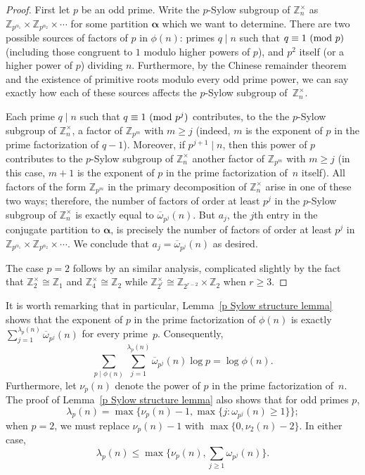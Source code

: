 \documentclass[12pt,reqno]{amsart}
\theoremstyle{definition}
\renewcommand{\mod}[1]{{\ifmmode\text{\rm\ (mod~$#1$)}\else\discretionary{}{}{\hbox{ }}\rm(mod~$#1$)\fi}}
\newcommand{\ovomega}{{\overline\omega}}
\newcommand{\Z}{{\mathbb Z}}
\newcommand{\Znt}{{\Z_n^\times}}
\newcommand{\balpha}{{\bm\alpha}}
\begin{document}
\begin{proof}
First let $p$ be an odd prime. Write the $p$-Sylow subgroup of $\Znt$ as $\Z_{p^{\alpha_1}} \times \Z_{p^{\alpha_2}} \times \cdots$ for some partition $\balpha$ which we want to determine. There are two possible sources of factors of $p$ in $\phi(n)$: primes $q\mid n$ such that $q \equiv 1 \mod p$ (including those congruent to $1$ modulo higher powers of $p$), and $p^2$ itself (or a higher power of $p$) dividing $n$. Furthermore, by the Chinese remainder theorem and the existence of primitive roots modulo every odd prime power, we can say exactly how each of these sources affects the $p$-Sylow subgroup of~$\Znt$.

Each prime $q \mid n$ such that $q \equiv 1 \mod {p^j}$ contributes, to the the $p$-Sylow subgroup of $\Znt$, a factor of $\Z_{p^m}$ with $m \geq j$ (indeed, $m$ is the exponent of $p$ in the prime factorization of $q-1$). Moreover, if $p^{j+1} \mid n$, then this power of $p$ contributes to the $p$-Sylow subgroup of $\Znt$ another factor of $\Z_{p^m}$ with $m\ge j$ (in this case, $m+1$ is the exponent of $p$ in the prime factorization of~$n$ itself). All factors of the form $\Z_{p^m}$ in the primary decomposition of $\Znt$ arise in one of these two ways; therefore, the number of factors of order at least $p^j$ in the $p$-Sylow subgroup of $\Znt$ is exactly equal to $\ovomega_{p^j}(n)$. But $a_j$, the $j$th entry in the conjugate partition to $\balpha$, is precisely the number of factors of order at least $p^j$ in $\Z_{p^{\alpha_1}} \times \Z_{p^{\alpha_2}} \times \cdots$. We conclude that $a_j = \ovomega_{p^j}(n)$ as desired.

The case $p = 2$ follows by an similar analysis, complicated slightly by the fact that $\Z_2^\times \cong \Z_1$ and $\Z_4^\times \cong \Z_2$ while $\Z_{2^r}^\times \cong \Z_{2^{r-2}} \times \Z_2$ when $r\ge3$.
\end{proof}

It is worth remarking that in particular, Lemma~\ref{p Sylow structure lemma} shows that the exponent of $p$ in the prime factorization of $\phi(n)$ is exactly $\sum_{j=1}^{\lambda_p(n)} \ovomega_{p^j}(n)$ for every prime~$p$. Consequently,
\begin{equation} \label{sum of its parts}
\sum_{p\mid\phi(n)} \sum_{j=1}^{\lambda_p(n)} \ovomega_{p^j}(n) \log p = \log\phi(n).
\end{equation}
Furthermore, let $\nu_p(n)$ denote the power of $p$ in the prime factorization of~$n$. The proof of Lemma~\ref{p Sylow structure lemma} also shows that for odd primes $p$,
\[
\lambda_p(n) = \max \big\{ \nu_p(n)-1, \max\{ j\colon \omega_{p^j}(n) \ge 1 \} \big\};
\]
when $p=2$, we must replace $\nu_p(n)-1$ with $\max\{0,\nu_2(n)-2\}$. In either case,
\begin{equation} \label{lambdapn bound}
\lambda_p(n) \le \max \bigg\{ \nu_p(n), \sum_{j\ge1} \omega_{p^j}(n) \bigg\}.
\end{equation}
\end{document}
